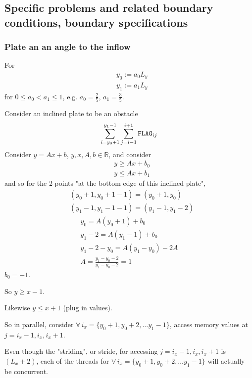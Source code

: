 \documentclass[10pt]{amsart}
\begin{document}
\begin{multicols*}{2}
\begin{enumerate}
  \end{enumerate}

\subsection{Specific problems and related boundary conditions, boundary specifications}

\subsubsection{Plate an an angle to the inflow}

For 
\[
\begin{aligned}
	& y_0 := a_0 L_y \\ 
	& y_1 := a_1 L_y 
\end{aligned}
\]
for $0\leq a_0 < a_1 \leq 1$, e.g. $a_0 = \frac{2}{5}$, $a_1 = \frac{3}{5}$.  

Consider an inclined plate to be an obstacle
\[
\sum_{i=y_0+1}^{y_1-1} \sum_{j=i-1}^{i+1} \verb|FLAG|_{ij}
\]
Consider $y=Ax+b$, $y,x,A,b\in \mathbb{R}$, and consider
\[
\begin{aligned}
	& y \geq Ax + b_0 \\
	& y \leq Ax + b_1 
\end{aligned}
\]
and so for the 2 points "at the bottom edge of this inclined plate", 
\[
\begin{aligned}
	& (y_0 + 1, y_0 + 1-1) = (y_0 + 1, y_0) \\ 
	& (y_1 - 1 , y_1 -1 -1 ) = (y_1 - 1, y_1 - 2) 
\end{aligned}
\]
\[
\begin{gathered}
	y_0 = A(y_0 + 1) +b_ 0 \\ 
y_1-2 = A(y_1 - 1) +b_0 \\
y_1-2- y_0 = A(y_1-y_0) -2A \\ 
A = \frac{y_1-y_0  - 2}{y_1-y_0-2 }  = 1 
\end{gathered}
\]
$b_0 = -1$.  

So $y \geq x -1$.  

Likewise $y\leq x+1$ (plug in values).  

So in parallel, consider $\forall \, i_x = \lbrace y_0 + 1 , y_0 + 2,\dots y_1 - 1 \rbrace$, access memory values at $j=i_x-1,i_x,i_x+1$.  

Even though the "striding", or stride, for accessing $j=i_x-1, i_x, i_x+1$ is $(L_x+2)$, each of the threads for $\forall \, i_x = \lbrace y_0 +1, y_0 + 2, \dots y_1-1\rbrace$ will actually be concurrent.  


\end{multicols*}
\end{document}
